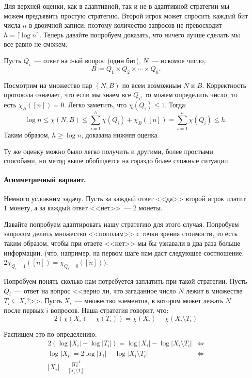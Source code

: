 Для верхней оценки, как в адаптивной, так и не в адаптивной стратегии мы можем предъявить простую
стратегию. Второй игрок может спросить каждый бит числа $n$ в двоичной записи; поэтому количество
запросов не превосходит $h = \lceil \log n \rceil$. Теперь давайте попробуем доказать, что ничего лучше
сделать мы все равно не сможем.
	
Пусть $Q_i$~--- ответ на $i$-ый вопрос (один бит), $N$~--- искомое число,
$$
    B \coloneqq Q_1\times Q_2 \times \cdots \times Q_h.
$$ 

Посмотрим на множество пар $(N, B)$ по всем возможным $N$ и $B$. Корректность протокола означает, что
если мы знаем все $Q_i$, то можем определить число, то есть $\chi_{B}([n]) = 0$. Легко заметить, что
$\chi(Q_i) \leq 1$. Тогда:
$$
    \log{n} \leq \chi(N, B) \leq \sum_{i=1}^{h} \chi(Q_i) + \chi_B([n]) = \sum_{i=1}^{h} \chi(Q_i) \le
    h.
$$
Таким образом, $h \ge \log{n}$, доказана нижняя оценка.
	
Ту же оценку можно было легко получить и другими, более простыми способами, но метод выше обобщается на
гораздо более сложные ситуации.

\paragraph{Асимметричный вариант.}
Немного усложним задачу. Пусть за каждый ответ <<да>> второй игрок платит $1$ монету, а за каждый ответ
<<нет>>~--- 2 монеты.

Давайте попробуем адаптировать нашу стратегию для этого случая. Попробуем запросом делить множество
<<пополам>> с точки зрения стоимости, то есть таким образом, чтобы при ответе <<нет>> мы бы узнавали в
два раза больше информации. (что, например, на первом шаге нам даст следующее соотношение:
$2 \chi_{Q_i = 1}([n]) = \chi_{Q_i = 0}([n])$).

Попробуем понять сколько нам потребуется заплатить при такой стратегии. Пусть $Q_i$~--- ответ на вопрос
<<верно ли, что загаданное число $N$ лежит в множестве $T_i \subseteq X_i$?>>. Пусть $X_i$~--- множество
элементов, в котором может лежать $N$ после первых $i$ вопросов. Наша стратегия говорит, что:
$$
    2 (\chi(X_i) - \chi(T_i)) = \chi(X_i) - \chi(X_i \setminus T_i)
$$

Распишем это по определению:
\begin{align*}
  2(\log|X_i| - \log |T_i|) = \log|X_i| - \log|X_i \setminus T_i| &\iff\\
  \log |X_i| = 2 \log |T_i| - \log |X_i \setminus T_i| &\iff\\
  |X_i| = \frac{|T_i|^2}{|X_i\setminus T_i|}.
\end{align*}


